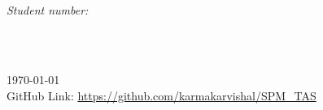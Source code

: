 \begin{titlepage}
\begin{minipage}{0.4\textwidth}
\begin{flushleft}
    
    
    \end{flushleft}
    \end{minipage}
    ~
    \begin{minipage}{0.4\textwidth}
    \begin{flushright} \large
    \emph{Student number:} \\
    \snum \\[1.2em] 
    \end{flushright}
    \end{minipage}\\[2cm]
    \makeatother
    
    
    {\large \today}\\[2cm] %
    
    
    GitHub Link: \url{https://github.com/karmakarvishal/SPM_TAS}\par
    \vfill %
    
    \end{titlepage}